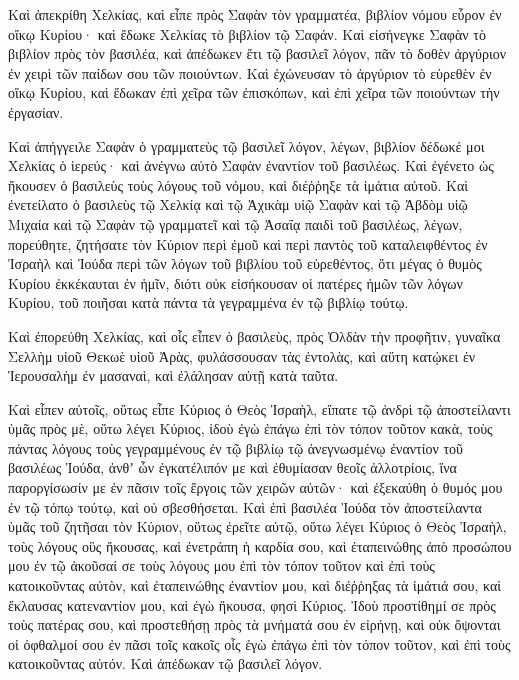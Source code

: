 {Καὶ ἀπεκρίθη Χελκίας, καὶ εἶπε πρὸς Σαφὰν τὸν γραμματέα, βιβλίον νόμου εὗρον ἐν οἴκῳ Κυρίου· καὶ ἔδωκε Χελκίας τὸ βιβλίον τῷ Σαφάν.
Καὶ εἰσήνεγκε Σαφὰν τὸ βιβλίον πρὸς τὸν βασιλέα, καὶ ἀπέδωκεν ἔτι τῷ βασιλεῖ λόγον, πᾶν τὸ δοθὲν ἀργύριον ἐν χειρὶ τῶν παίδων σου τῶν ποιούντων.
Καὶ ἐχώνευσαν τὸ ἀργύριον τὸ εὑρεθὲν ἐν οἴκῳ Κυρίου, καὶ ἔδωκαν ἐπὶ χεῖρα τῶν ἐπισκόπων, καὶ ἐπὶ χεῖρα τῶν ποιούντων τὴν ἐργασίαν.
\par }{\PP {}Καὶ ἀπήγγειλε Σαφὰν ὁ γραμματεὺς τῷ βασιλεῖ λόγον, λέγων, βιβλίον δέδωκέ μοι Χελκίας ὁ ἱερεύς· καὶ ἀνέγνω αὐτὸ Σαφὰν ἐναντίον τοῦ βασιλέως.
Καὶ ἐγένετο ὡς ἤκουσεν ὁ βασιλεὺς τοὺς λόγους τοῦ νόμου, καὶ διέῤῥηξε τὰ ἱμάτια αὐτοῦ.
Καὶ ἐνετείλατο ὁ βασιλεὺς τῷ Χελκίᾳ καὶ τῷ Ἀχικὰμ υἱῷ Σαφὰν καὶ τῷ Ἀβδὸμ υἱῷ Μιχαία καὶ τῷ Σαφὰν τῷ γραμματεῖ καὶ τῷ Ἀσαΐᾳ παιδὶ τοῦ βασιλέως, λέγων,
πορεύθητε, ζητήσατε τὸν Κύριον περὶ ἐμοῦ καὶ περὶ παντὸς τοῦ καταλειφθέντος ἐν Ἰσραὴλ καὶ Ἰούδα περὶ τῶν λόγων τοῦ βιβλίου τοῦ εὑρεθέντος, ὅτι μέγας ὁ θυμὸς Κυρίου ἐκκέκαυται ἐν ἡμῖν, διότι οὐκ εἰσήκουσαν οἱ πατέρες ἡμῶν τῶν λόγων Κυρίου, τοῦ ποιῆσαι κατὰ πάντα τὰ γεγραμμένα ἐν τῷ βιβλίῳ τούτῳ.
\par }{\PP {}Καὶ ἐπορεύθη Χελκίας, καὶ οἷς εἶπεν ὁ βασιλεὺς, πρὸς Ὀλδὰν τὴν προφῆτιν, γυναῖκα Σελλὴμ υἱοῦ Θεκωὲ υἱοῦ Ἀρὰς, φυλάσσουσαν τὰς ἐντολὰς, καὶ αὕτη κατῴκει ἐν Ἱερουσαλὴμ ἐν μασαναὶ, καὶ ἐλάλησαν αὐτῇ κατὰ ταῦτα.
\par }{\PP {}Καὶ εἶπεν αὐτοῖς, οὕτως εἶπε Κύριος ὁ Θεὸς Ἰσραὴλ, εἴπατε τῷ ἀνδρὶ τῷ ἀποστείλαντι ὑμᾶς πρὸς μὲ,
οὕτω λέγει Κύριος, ἰδοὺ ἐγὼ ἐπάγω ἐπὶ τὸν τόπον τοῦτον κακὰ, τοὺς πάντας λόγους τοὺς γεγραμμένους ἐν τῷ βιβλίῳ τῷ ἀνεγνωσμένῳ ἐναντίον τοῦ βασιλέως Ἰούδα,
ἀνθʼ ὧν ἐγκατέλιπόν με καὶ ἐθυμίασαν θεοῖς ἀλλοτρίοις, ἵνα παροργίσωσίν με ἐν πᾶσιν τοῖς ἔργοις τῶν χειρῶν αὐτῶν· καὶ ἐξεκαύθη ὁ θυμός μου ἐν τῷ τόπῳ τούτῳ, καὶ οὐ σβεσθήσεται.
Καὶ ἐπὶ βασιλέα Ἰούδα τὸν ἀποστείλαντα ὑμᾶς τοῦ ζητῆσαι τὸν Κύριον, οὕτως ἐρεῖτε αὐτῷ, οὕτω λέγει Κύριος ὁ Θεὸς Ἰσραὴλ, τοὺς λόγους οὓς ἤκουσας,
καὶ ἐνετράπη ἡ καρδία σου, καὶ ἐταπεινώθης ἀπὸ προσώπου μου ἐν τῷ ἀκοῦσαί σε τοὺς λόγους μου ἐπὶ τὸν τόπον τοῦτον καὶ ἐπὶ τοὺς κατοικοῦντας αὐτὸν, καὶ ἐταπεινώθης ἐναντίον μου, καὶ διέῤῥηξας τὰ ἱμάτιά σου, καὶ ἔκλαυσας κατεναντίον μου, καὶ ἐγὼ ἤκουσα, φησὶ Κύριος.
Ἰδοὺ προστίθημί σε πρὸς τοὺς πατέρας σου, καὶ προστεθήσῃ πρὸς τὰ μνήματά σου ἐν εἰρήνῃ, καὶ οὐκ ὄψονται οἱ ὀφθαλμοί σου ἐν πᾶσι τοῖς κακοῖς οἷς ἐγὼ ἐπάγω ἐπὶ τὸν τόπον τοῦτον, καὶ ἐπὶ τοὺς κατοικοῦντας αὐτόν. Καὶ ἀπέδωκαν τῷ βασιλεῖ λόγον.
}

